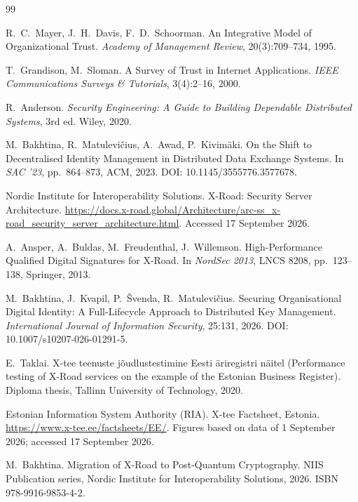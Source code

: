 \documentclass[conference,a4paper]{IEEEtran}
\begin{document}
\begin{thebibliography}{99}

R.~C.~Mayer, J.~H.~Davis, F.~D.~Schoorman.
\newblock An Integrative Model of Organizational Trust.
\newblock \emph{Academy of Management Review}, 20(3):709--734, 1995.

T.~Grandison, M.~Sloman.
\newblock A Survey of Trust in Internet Applications.
\newblock \emph{IEEE Communications Surveys \& Tutorials}, 3(4):2--16, 2000.

R.~Anderson.
\newblock \emph{Security Engineering: A Guide to Building Dependable Distributed Systems}, 3rd ed.
\newblock Wiley, 2020.

M.~Bakhtina, R.~Matulevi\v{c}ius, A.~Awad, P.~Kivim\"{a}ki.
\newblock On the Shift to Decentralised Identity Management in Distributed Data Exchange Systems.
\newblock In \emph{SAC '23}, pp.~864--873, ACM, 2023.
\newblock DOI: 10.1145/3555776.3577678.

Nordic Institute for Interoperability Solutions.
\newblock X-Road: Security Server Architecture.
\newblock \url{https://docs.x-road.global/Architecture/arc-ss_x-road_security_server_architecture.html}.
\newblock Accessed 17 September 2026.

A.~Ansper, A.~Buldas, M.~Freudenthal, J.~Willemson.
\newblock High-Performance Qualified Digital Signatures for X-Road.
\newblock In \emph{NordSec 2013}, LNCS 8208, pp.~123--138, Springer, 2013.

M.~Bakhtina, J.~Kvapil, P.~\v{S}venda, R.~Matulevi\v{c}ius.
\newblock Securing Organisational Digital Identity: A Full-Lifecycle Approach to Distributed Key
Management.
\newblock \emph{International Journal of Information Security}, 25:131, 2026.
\newblock DOI: 10.1007/s10207-026-01291-5.

E.~Taklai.
\newblock X-tee teenuste j\~{o}udlustestimine Eesti \"{a}riregistri n\"{a}itel
(Performance testing of X-Road services on the example of the Estonian Business Register).
\newblock Diploma thesis, Tallinn University of Technology, 2020.

Estonian Information System Authority (RIA).
\newblock X-tee Factsheet, Estonia.
\newblock \url{https://www.x-tee.ee/factsheets/EE/}.
\newblock Figures based on data of 1 September 2026; accessed 17 September 2026.

M.~Bakhtina.
\newblock Migration of X-Road to Post-Quantum Cryptography.
\newblock NIIS Publication series, Nordic Institute for Interoperability Solutions, 2026.
\newblock ISBN 978-9916-9853-4-2.


\end{thebibliography}
\end{document}
